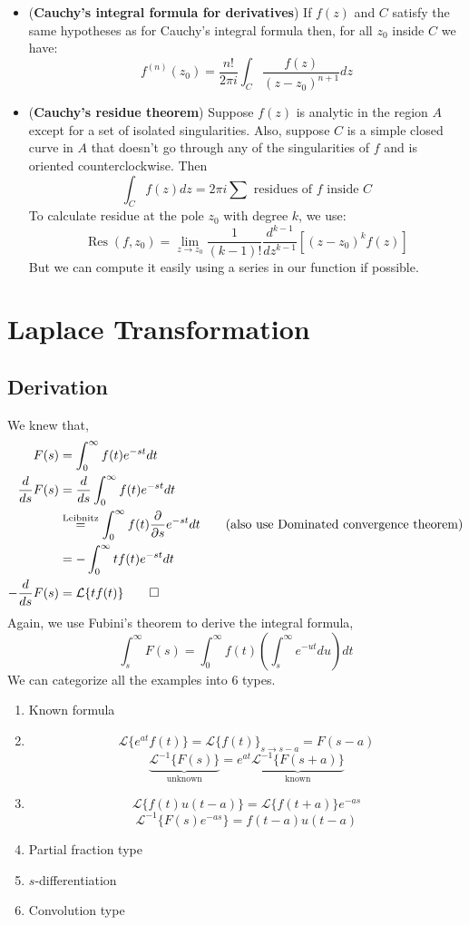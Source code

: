 \begin{itemize}
    \item (\textbf{Cauchy's integral formula for derivatives}) If $f(z)$ and $C$ satisfy the same hypotheses as for Cauchy's integral formula then, for all $z_0$ inside $C$ we have: $$f^{(n)}(z_0)=\frac{n!}{2\pi i}\int_C \frac{f(z)}{(z-z_0)^{n+1}}dz$$
    \item (\textbf{Cauchy's residue theorem}) Suppose $f(z)$ is analytic in the region $A$ except for a set of isolated singularities. Also, suppose $C$ is a simple closed curve in $A$ that doesn't go through any of the singularities of $f$ and is oriented counterclockwise. Then $$\int_C f(z) d z=2 \pi i \sum \text{ residues of } f \text { inside } C$$
    To calculate residue at the pole $z_0$ with degree $k$, we use:
    $$\operatorname{Res}(f,z_0)=\lim_{z\rightarrow z_0}\frac{1}{(k-1)!}\frac{d^{k-1}}{dz^{k-1}}\left[(z-z_0)^k f(z)\right]$$
    But we can compute it easily using a series in our function if possible.  
\end{itemize}

\chapter{Laplace Transformation}
\section{Derivation}
We knew that, 
\begin{align*}
    F(s)&=\int_0^\infty f(t) e^{-st}dt\\
    \frac{d}{ds} F(s) &= \frac{d}{ds} \int_0^\infty f(t) e^{-st}dt\\
    &\stackrel{\text{Leibnitz}}{=} \int_0^\infty f(t) \frac{\partial}{\partial s} e^{-st} dt\qquad \text{(also use Dominated convergence theorem)}\\
    &= - \int_0^\infty  tf(t) e^{-st} dt\\
    -\frac{d}{ds} F(s) &= \mathcal{L}\{tf(t)\}\qed 
\end{align*}
Again, we use Fubini's theorem to derive the integral formula, 
$$\int_s^\infty F(s)=\int_0^\infty f(t)\left(\int_s^\infty e^{-ut}du\right)dt$$
We can categorize all the examples into $ 6$ types. 
\begin{enumerate}
    \item Known formula 
    \item $$\mathcal L\{e^{at}f(t)\}=\mathcal L\{f(t)\}_{s\rightarrow s-a}=F(s-a)$$
    $$\underbrace{\mathcal L^{-1}\{F(s)\}}_{\text{unknown}}=e^{at}\underbrace{\mathcal L^{-1}\{F(s+a)\}}_{\text{known}}$$
    \item $$\mathcal{L}\{f(t)u(t-a)\}=\mathcal{L}\{f(t+a)\}e^{-as}$$
    $$\mathcal{L}^{-1}\{F(s)e^{-as}\}=f(t-a)u(t-a)$$
    \item Partial fraction type
    \item $s$-differentiation 
    \item Convolution type
\end{enumerate}

